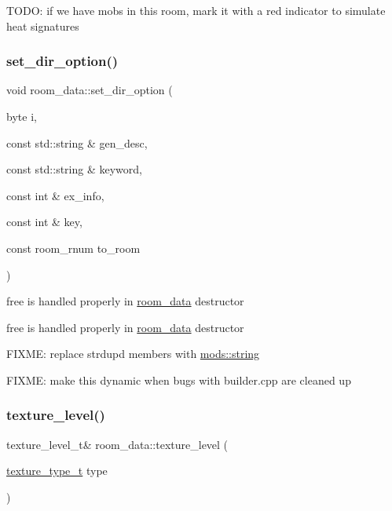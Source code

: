 T\+O\+DO\+: if we have mobs in this room, mark it with a red indicator to simulate heat signatures \mbox{\label{structroom__data_a34bca78611d71d3aaffa3c3353bd14f9}} 
\subsubsection{\texorpdfstring{set\+\_\+dir\+\_\+option()}{set\_dir\_option()}}
{\footnotesize\ttfamily void room\+\_\+data\+::set\+\_\+dir\+\_\+option (\begin{DoxyParamCaption}\item[{byte}]{i,  }\item[{const std\+::string \&}]{gen\+\_\+desc,  }\item[{const std\+::string \&}]{keyword,  }\item[{const int \&}]{ex\+\_\+info,  }\item[{const int \&}]{key,  }\item[{const room\+\_\+rnum}]{to\+\_\+room }\end{DoxyParamCaption})}

free is handled properly in \hyperlink{structroom__data}{room\+\_\+data} destructor

free is handled properly in \hyperlink{structroom__data}{room\+\_\+data} destructor

F\+I\+X\+ME\+: replace strdup\textquotesingle{}d members with \hyperlink{structmods_1_1string}{mods\+::string}

F\+I\+X\+ME\+: make this dynamic when bugs with builder.\+cpp are cleaned up \mbox{\label{structroom__data_aae0acfa6fdd06020915943202f3826c2}} 
\subsubsection{\texorpdfstring{texture\+\_\+level()}{texture\_level()}}
{\footnotesize\ttfamily texture\+\_\+level\+\_\+t\& room\+\_\+data\+::texture\+\_\+level (\begin{DoxyParamCaption}\item[{\hyperlink{structroom__data_a9552b46091ee649079e41f04f9543b8e}{texture\+\_\+type\+\_\+t}}]{type }\end{DoxyParamCaption})\hspace{0.3cm}{\ttfamily [inline]}}

